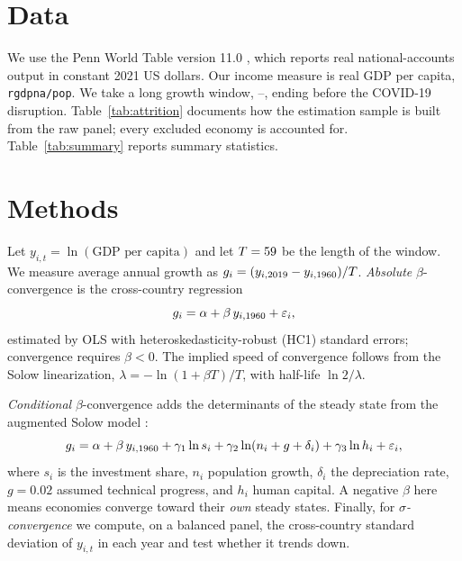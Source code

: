 \documentclass[11pt]{article}
\begin{document}
\section{Data}
\label{sec:data}
We use the Penn World Table version 11.0 \citep{feenstra2015}, which reports real
national-accounts output in constant 2021 US dollars. Our income measure is real
GDP per capita, \texttt{rgdpna/pop}. We take a long growth window,
\startYear--\finalYear, ending before the COVID-19 disruption. Table~\ref{tab:attrition}
documents how the estimation sample is built from the raw panel; every excluded
economy is accounted for. Table~\ref{tab:summary} reports summary statistics.




\section{Methods}
\label{sec:methods}
Let $y_{i,t} = \ln(\text{GDP per capita})$ and let $T = 59$ be the length
of the window. We measure average annual growth as
$g_i = (y_{i,2019} - y_{i,1960})/T$. \emph{Absolute} $\beta$-convergence
is the cross-country regression
\begin{equation}
  g_i = \alpha + \beta\, y_{i,1960} + \varepsilon_i,
  \label{eq:absolute}
\end{equation}
estimated by OLS with heteroskedasticity-robust (HC1) standard errors;
convergence requires $\beta < 0$. The implied speed of convergence follows from
the Solow linearization, $\lambda = -\ln(1 + \beta T)/T$, with half-life
$\ln 2/\lambda$.

\emph{Conditional} $\beta$-convergence adds the determinants of the steady state
from the augmented Solow model \citep{mrw1992}:
\begin{equation}
  g_i = \alpha + \beta\, y_{i,1960}
      + \gamma_1 \ln s_i + \gamma_2 \ln(n_i + g + \delta_i)
      + \gamma_3 \ln h_i + \varepsilon_i,
  \label{eq:conditional}
\end{equation}
where $s_i$ is the investment share, $n_i$ population growth, $\delta_i$ the
depreciation rate, $g = 0.02$ assumed technical progress, and $h_i$ human
capital. A negative $\beta$ here means economies converge toward their
\emph{own} steady states. Finally, for \emph{$\sigma$-convergence} we compute, on
a balanced panel, the cross-country standard deviation of $y_{i,t}$ in each year
and test whether it trends down.
\end{document}
